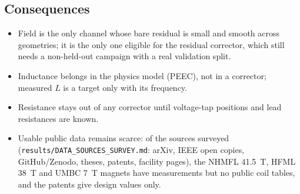 \subsection{Consequences}
\begin{itemize}
\item Field is the only channel whose bare residual is small and smooth across geometries; it is the only one eligible for the residual corrector, which still needs a non-held-out campaign with a real validation split.
\item Inductance belongs in the physics model (PEEC), not in a corrector; measured $L$ is a target only with its frequency.
\item Resistance stays out of any corrector until voltage-tap positions and lead resistances are known.
\item Usable public data remains scarce: of the sources surveyed (\texttt{results/DATA\_SOURCES\_SURVEY.md}: arXiv, IEEE open copies, GitHub/Zenodo, theses, patents, facility pages), the NHMFL 41.5~T, HFML 38~T and UMBC 7~T magnets have measurements but no public coil tables, and the patents give design values only.
\end{itemize}

\FloatBarrier
